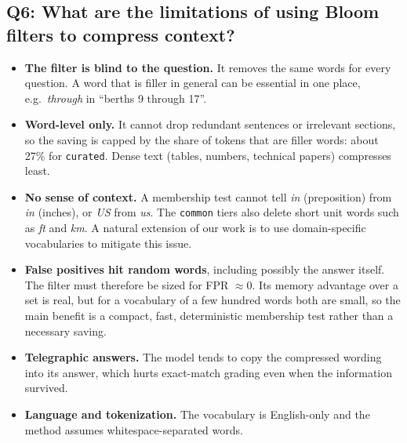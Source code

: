 \documentclass[11pt]{article}
\newcommand{\code}[1]{\texttt{#1}}
\begin{document}
\subsection{Q6: What are the limitations of using Bloom filters to compress context?}
\begin{itemize}
  \item \textbf{The filter is blind to the question.} It removes the same words for every question.
        A word that is filler in general can be essential in one place, e.g.\ \emph{through} in
        ``berths 9 through 17''.
  \item \textbf{Word-level only.} It cannot drop redundant sentences or irrelevant sections, so the
        saving is capped by the share of tokens that are filler words: about 27\% for
        \code{curated}. Dense text (tables, numbers, technical papers) compresses least.
  \item \textbf{No sense of context.} A membership test cannot tell \emph{in} (preposition) from
        \emph{in} (inches), or \emph{US} from \emph{us}. The \code{common} tiers also delete short unit
        words such as \emph{ft} and \emph{km}. A natural extension of our work is to use domain-specific 
        vocabularies to mitigate this issue. 
  \item \textbf{False positives hit random words}, including possibly the answer itself. The filter
        must therefore be sized for FPR $\approx 0$. Its memory advantage over a set is real, but for a
        vocabulary of a few hundred words both are small, so the main benefit is a compact, fast,
        deterministic membership test rather than a necessary saving.
  \item \textbf{Telegraphic answers.} The model tends to copy the compressed wording into its
        answer, which hurts exact-match grading even when the information survived.
  \item \textbf{Language and tokenization.} The vocabulary is English-only and the method assumes
        whitespace-separated words.
\end{itemize}

\appendix
\end{document}
